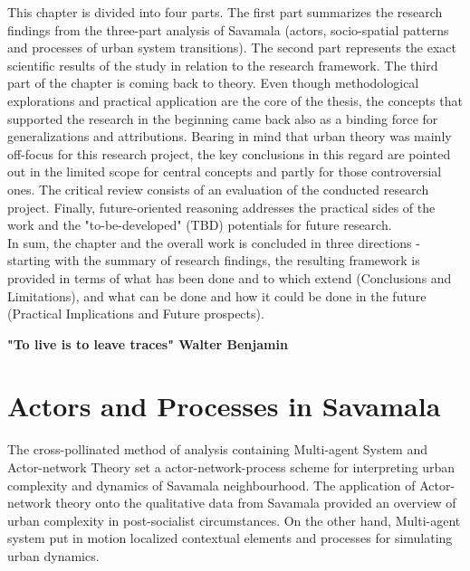 \documentclass[11pt]{report}
\begin{document}
{{{This chapter is divided into four parts. 
The first part summarizes the research findings from the three-part analysis of Savamala (actors, socio-spatial patterns and processes of urban system transitions).
The second part represents the exact scientific results of the study in relation to the research framework.
The third part of the chapter is coming back to theory.
Even though methodological explorations and practical application are the core of the thesis, the concepts that supported the research in the beginning came back also as a binding force for generalizations and attributions.
Bearing in mind that urban theory was mainly off-focus for this research project, the key conclusions in this regard are pointed out in the limited scope for central concepts and partly for those controversial ones.
The critical review consists of an evaluation of the conducted research project.
Finally, future-oriented reasoning addresses the practical sides of the work and the "to-be-developed" (TBD) potentials for future research.
\\

In sum, the chapter and the overall work is concluded in three directions - starting with the summary of research findings, the resulting framework is provided 
in terms of what has been done and to which extend (Conclusions and Limitations), and what can be done and how it could be done in the future (Practical Implications and Future prospects).

\textbf{"To live is to leave traces" Walter Benjamin}

\section{Actors and Processes in Savamala}

The cross-pollinated method of analysis containing Multi-agent System and Actor-network Theory set a actor-network-process scheme for interpreting urban complexity and dynamics of Savamala neighbourhood.
The application of Actor-network theory onto the qualitative data from Savamala provided an overview of urban complexity in post-socialist circumstances. On the other hand, Multi-agent system put in motion localized contextual elements and processes for simulating urban dynamics.
\\

}}}
\end{document}
